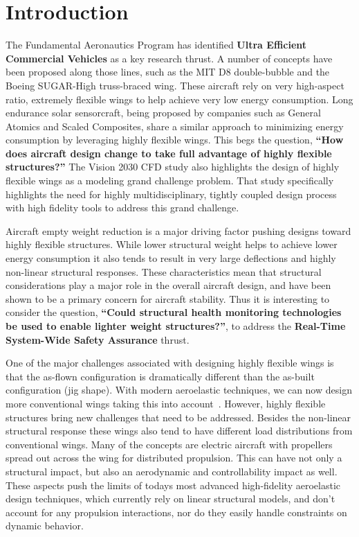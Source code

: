 \documentclass[]{aiaa-tc}
\begin{document}
  \newpage

  \section{Introduction}

    The Fundamental Aeronautics Program has identified \textbf{Ultra Efficient Commercial Vehicles} as 
    a key research thrust. A number of concepts have been proposed along those lines, such as 
    the MIT D8 double­-bubble and the Boeing SUGAR­-High truss­-braced wing. These aircraft rely on 
    very high­-aspect ratio, extremely flexible wings to help achieve very low energy consumption. 
    Long endurance solar sensorcraft, being proposed by companies such as General Atomics and 
    Scaled Composites, share a similar approach to minimizing energy consumption by leveraging highly 
    flexible wings. This begs the question, \textbf{``How does aircraft design change to take full 
    advantage of highly flexible structures?''} The Vision 2030 CFD study also highlights the 
    design of highly flexible wings as a modeling grand challenge problem. That study specifically 
    highlights the need for highly multidisciplinary, tightly coupled design process with high 
    fidelity tools to address this grand challenge.

    Aircraft empty weight reduction is a major driving factor pushing designs toward highly flexible structures. 
    While lower structural weight helps to achieve lower energy consumption it also tends to result in very large 
    deflections and highly non-linear structural responses. These characteristics mean that 
    structural considerations play a major role in the overall aircraft design, and have been shown to be a primary 
    concern for aircraft stability\cite{heliosfailure_2007}. Thus it is interesting to consider the question, 
    \textbf{``Could structural health monitoring technologies be used to enable lighter 
    weight structures?''}, to address the \textbf{Real­-Time System­-Wide Safety Assurance} thrust. 

    One of the major challenges associated with designing highly flexible wings is that the as-flown configuration 
    is dramatically different than the as-built configuration (jig shape). With modern aeroelastic techniques, 
    we can now design more conventional wings taking this into account~\cite{Kennedy:2014:tacs-tripan, Kennedy:2012:CMC, 
      Kennedy:2014:High-aspect-ratio}. However, highly flexible
    structures bring new challenges that need to be addressed. Besides the non-linear structural 
    response these wings also tend to have different load distributions from conventional wings. Many of the concepts 
    are electric aircraft with propellers spread out across the wing for distributed propulsion. This can have not only a 
    structural impact, but also an aerodynamic and controllability impact as well. These aspects push the 
    limits of todays most advanced high-fidelity aeroelastic design techniques, which currently rely on linear structural 
    models, and don't account for any propulsion interactions, nor do they easily handle constraints on dynamic behavior. 
\end{document}
